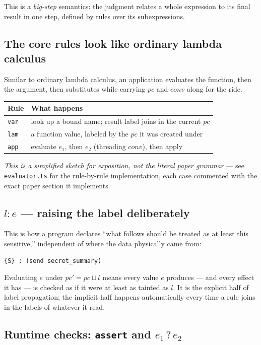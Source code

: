 \documentclass[11pt, a4paper]{article}
\newcommand{\joinop}{\sqcup}
\begin{document}
This is a \emph{big-step} semantics: the judgment relates a whole
expression to its final result in one step, defined by rules over its
subexpressions.

\subsection{The core rules look like ordinary lambda calculus}

Similar to ordinary lambda calculus, an application evaluates the function,
then the argument, then substitutes while carrying $pc$ and $\mathit{conv}$
along for the ride.


\begin{tabular}{@{}ll@{}}
\toprule
Rule & What happens \\
\midrule
\texttt{var} & look up a bound name; result label joins in the current $pc$ \\
\texttt{lam} & a function value, labeled by the $pc$ it was created under \\
\texttt{app} & evaluate $e_1$, then $e_2$ (threading $\mathit{conv}$), then apply \\
\bottomrule
\end{tabular}

\emph{This is a simplified sketch for exposition, not the literal paper
grammar} --- see \texttt{evaluator.ts} for the rule-by-rule
implementation, each case commented with the exact paper section it
implements.

\subsection{\texorpdfstring{$l : e$}{l : e} --- raising the label deliberately}

This is how a program declares ``what follows should be treated as at
least this sensitive,'' independent of where the data physically came
from:

\begin{lstlisting}
{S} : (send secret_summary)
\end{lstlisting}

Evaluating $e$ under $pc' = pc \joinop l$ means every value $e$ produces
--- and every effect it has --- is checked as if it were at least as
tainted as $l$. It is the explicit half of label propagation; the
implicit half happens automatically every time a rule joins in the labels
of whatever it read.

\subsection{Runtime checks: \texttt{assert} and \texorpdfstring{$e_1\mathbin{?}e_2$}{e1 ? e2}}
\end{document}
